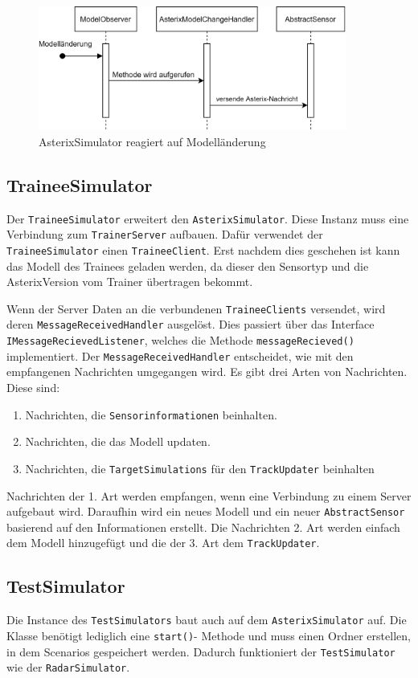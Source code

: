 \begin{figure}[ht]
    \centering
    \includegraphics[width=0.9\textwidth]{content/assets/Kapitel4/AsterixSimulator.png}
    \caption{AsterixSimulator reagiert auf Modelländerung}
    \label{fig:AsterixSimulator}
\end{figure}

\subsection{TraineeSimulator}

Der \texttt{TraineeSimulator} erweitert den \texttt{AsterixSimulator}. Diese Instanz muss eine Verbindung zum \texttt{TrainerServer} aufbauen. Dafür verwendet der \texttt{TraineeSimulator} einen \texttt{TraineeClient}. Erst nachdem dies geschehen ist kann das Modell des Trainees geladen werden, da dieser den Sensortyp und die AsterixVersion vom Trainer übertragen bekommt.

Wenn der Server Daten an die verbundenen \texttt{TraineeClients} versendet, wird deren \texttt{MessageReceivedHandler} ausgelöst. Dies passiert über das Interface \texttt{IMessageRecievedListener}, welches die Methode \texttt{messageRecieved()} implementiert. Der \texttt{MessageReceivedHandler} entscheidet, wie mit den empfangenen Nachrichten umgegangen wird. Es gibt drei Arten von Nachrichten. Diese sind:

\begin{enumerate}
    \item Nachrichten, die \texttt{Sensorinformationen} beinhalten.
    \item Nachrichten, die das Modell updaten.
    \item Nachrichten, die \texttt{TargetSimulations} für den \texttt{TrackUpdater} beinhalten
\end{enumerate}

Nachrichten der 1. Art werden empfangen, wenn eine Verbindung zu einem Server aufgebaut wird. Daraufhin wird ein neues Modell und ein neuer \texttt{AbstractSensor} basierend auf den Informationen erstellt. Die Nachrichten 2. Art werden einfach dem Modell hinzugefügt und die der 3. Art dem \texttt{TrackUpdater}.

\subsection{TestSimulator}
Die Instance des \texttt{TestSimulators} baut auch auf dem \texttt{AsterixSimulator} auf. Die Klasse benötigt lediglich eine \texttt{start()}- Methode und muss einen Ordner erstellen, in dem Scenarios gespeichert werden. Dadurch funktioniert der \texttt{TestSimulator} wie der \texttt{RadarSimulator}.